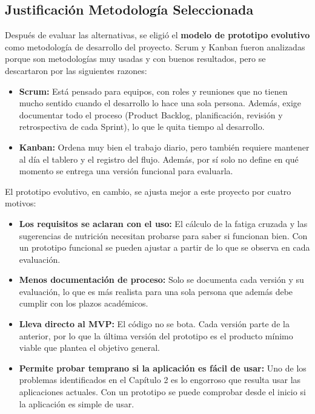 \subsection{Justificación Metodología Seleccionada}

Después de evaluar las alternativas, se eligió el \textbf{modelo de prototipo evolutivo} como metodología de desarrollo del proyecto. Scrum y Kanban fueron analizadas porque son metodologías muy usadas y con buenos resultados, pero se descartaron por las siguientes razones:
\begin{itemize}
    \item \textbf{Scrum:} Está pensado para equipos, con roles y reuniones que no tienen mucho sentido cuando el desarrollo lo hace una sola persona. Además, exige documentar todo el proceso (Product Backlog, planificación, revisión y retrospectiva de cada Sprint), lo que le quita tiempo al desarrollo.
    \item \textbf{Kanban:} Ordena muy bien el trabajo diario, pero también requiere mantener al día el tablero y el registro del flujo. Además, por sí solo no define en qué momento se entrega una versión funcional para evaluarla.
\end{itemize}

El prototipo evolutivo, en cambio, se ajusta mejor a este proyecto por cuatro motivos:
\begin{itemize}
    \item \textbf{Los requisitos se aclaran con el uso:} El cálculo de la fatiga cruzada y las sugerencias de nutrición necesitan probarse para saber si funcionan bien. Con un prototipo funcional se pueden ajustar a partir de lo que se observa en cada evaluación.
    \item \textbf{Menos documentación de proceso:} Solo se documenta cada versión y su evaluación, lo que es más realista para una sola persona que además debe cumplir con los plazos académicos.
    \item \textbf{Lleva directo al MVP:} El código no se bota. Cada versión parte de la anterior, por lo que la última versión del prototipo es el producto mínimo viable que plantea el objetivo general.
    \item \textbf{Permite probar temprano si la aplicación es fácil de usar:} Uno de los problemas identificados en el Capítulo 2 es lo engorroso que resulta usar las aplicaciones actuales. Con un prototipo se puede comprobar desde el inicio si la aplicación es simple de usar.
\end{itemize}

